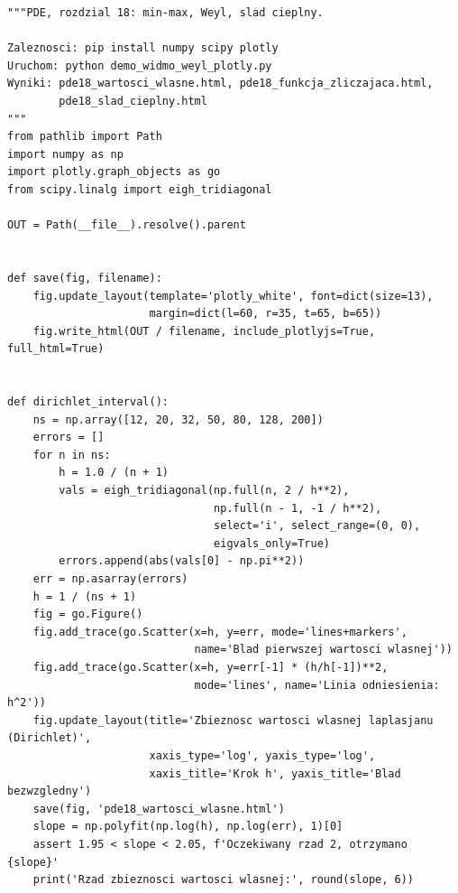 \begin{lstlisting}[style=pythonpde,caption={Wartości własne, prawo Weyla i ślad cieplny (Plotly)},label={code:pde18-plotly}]
"""PDE, rozdzial 18: min-max, Weyl, slad cieplny.

Zaleznosci: pip install numpy scipy plotly
Uruchom: python demo_widmo_weyl_plotly.py
Wyniki: pde18_wartosci_wlasne.html, pde18_funkcja_zliczajaca.html,
        pde18_slad_cieplny.html
"""
from pathlib import Path
import numpy as np
import plotly.graph_objects as go
from scipy.linalg import eigh_tridiagonal

OUT = Path(__file__).resolve().parent


def save(fig, filename):
    fig.update_layout(template='plotly_white', font=dict(size=13),
                      margin=dict(l=60, r=35, t=65, b=65))
    fig.write_html(OUT / filename, include_plotlyjs=True, full_html=True)


def dirichlet_interval():
    ns = np.array([12, 20, 32, 50, 80, 128, 200])
    errors = []
    for n in ns:
        h = 1.0 / (n + 1)
        vals = eigh_tridiagonal(np.full(n, 2 / h**2),
                                np.full(n - 1, -1 / h**2),
                                select='i', select_range=(0, 0),
                                eigvals_only=True)
        errors.append(abs(vals[0] - np.pi**2))
    err = np.asarray(errors)
    h = 1 / (ns + 1)
    fig = go.Figure()
    fig.add_trace(go.Scatter(x=h, y=err, mode='lines+markers',
                             name='Blad pierwszej wartosci wlasnej'))
    fig.add_trace(go.Scatter(x=h, y=err[-1] * (h/h[-1])**2,
                             mode='lines', name='Linia odniesienia: h^2'))
    fig.update_layout(title='Zbieznosc wartosci wlasnej laplasjanu (Dirichlet)',
                      xaxis_type='log', yaxis_type='log',
                      xaxis_title='Krok h', yaxis_title='Blad bezwzgledny')
    save(fig, 'pde18_wartosci_wlasne.html')
    slope = np.polyfit(np.log(h), np.log(err), 1)[0]
    assert 1.95 < slope < 2.05, f'Oczekiwany rzad 2, otrzymano {slope}'
    print('Rzad zbieznosci wartosci wlasnej:', round(slope, 6))



\end{lstlisting}
